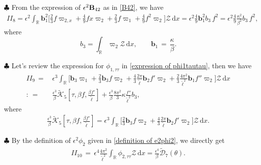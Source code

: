 \documentclass[10pt, reqno]{amsart}
\numberwithin{equation}{section}
\theoremstyle{definition}
\begin{document}
{\smallskip\noindent $\clubsuit$
 From the expression of $ \epsilon^2 {\bf B}_{42}$ as in \eqref{B42}, we have
\begin{align}\label{B4emathcal Z2}
II_8
 =\epsilon^2\int_{{\mathbb R}} {\mathbf b}_1^2\Big[
\frac{2}{3}f\varpi_{2,x}
+ \frac{4}{9} f x\varpi_2
+\frac{2}{3}f\varpi_1
+ \frac{4}{9} f^2\varpi_2
\Big]\mathcal Z \,{\mathrm d}x
= \epsilon^2 \frac{4}{9}  {\mathbf b}_1^2 b_3\,f^2
=\epsilon^2 \frac{4}{9} \frac{\kappa^2}{\beta^2} b_3\,f^2 ,
\end{align}
where
$$
b_3= \int_{\mathbb R} \varpi_2\mathcal Z \,{\mathrm d}x,
\qquad
 {\mathbf b}_1\,=\,\frac{\kappa}{\beta}.
$$









\smallskip\noindent $\clubsuit$
 Let's review the expression for $\phi_{1, \tau\tau} $ in \eqref{expression of phi1tautau}, then we have
\begin{align} \label{phitautau mathcal Z}
II_9
 \,=\, &\epsilon^3 \int_{\mathbb R} \Big[{\mathbf b}_3 \varpi_{1}
+\frac{2}{3}{\mathbf b}_3 f \varpi_{2}
+\frac{4}{3}\frac{2\pi}{{\tilde\ell}}{\mathbf b}_2f' \varpi_{2}
+\frac{2}{3}\frac{4\pi^2}{{\tilde\ell}^2} {\mathbf b}_1 f''\varpi_{2} \Big]
\mathcal Z \,{\mathrm d}x
\nonumber\\[2mm]
:  \,=\,&\frac{\epsilon^3}{\beta}\tilde{\mathcal K}_5\left[\tau, \beta{ f}, \frac{\beta{f}'}{\tilde\ell}\right]
+ \frac{\epsilon^3}{\beta}\frac{8\pi^2}{3} \kappa\frac{ f''}{\tilde \ell^2}b_3,
\end{align}
where
\begin{align*}
\frac{\epsilon^3}{\beta}\tilde{\mathcal K}_5\left[\tau, \beta{ f}, \frac{\beta{f}'}{\tilde\ell}\right] = \epsilon^3 \int_{\mathbb R} \Big[
\frac{2}{3}{\mathbf b}_3 f \varpi_{2}
+
\frac{4}{3}\frac{2\pi}{{\tilde\ell}}{\mathbf b}_2f' \varpi_{2}
 \Big]
\mathcal Z \,{\mathrm d}x.
\end{align*}




\smallskip\noindent $\clubsuit$
By the definition of $\epsilon^2\phi_2$ given in \eqref{definition of e2phi2}, we directly get
\begin{align} \label{phi2tautau mathcal Z}
II_{10}\,=\,\epsilon^4 \frac{4\pi^2}{{\tilde\ell}^2}\int_{\mathbb R}\phi_{2, \tau\tau} {\mathcal Z} \,{\mathrm d}x =\frac{\epsilon^4}{\beta} \tilde{\mathcal D}_7(\theta).
\end{align}





}
\end{document}

